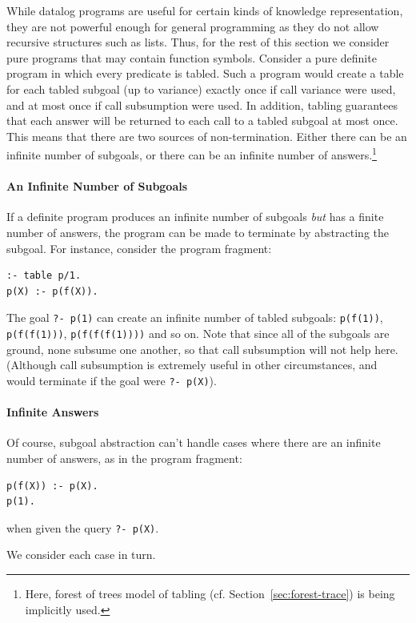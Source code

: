 While datalog programs are useful for certain kinds of knowledge
representation, they are not powerful enough for general programming
as they do not allow recursive structures such as lists.  Thus, for
the rest of this section we consider pure programs that may contain
function symbols.  Consider a pure definite program in which every
predicate is tabled.  Such a program would create a table for each
tabled subgoal (up to variance) exactly once if call variance were
used, and at most once if call subsumption were used.  In addition,
tabling guarantees that each answer will be returned to each call to a
tabled subgoal at most once.  This means that there are two sources of
non-termination.  Either there can be an infinite number of subgoals,
or there can be an infinite number of answers.\footnote{Here, forest
  of trees model of tabling (cf. Section~\ref{sec:forest-trace}) is
  being implicitly used.}

\paragraph{An Infinite Number of Subgoals}
%
If a definite program produces an infinite number of subgoals {\em
  but} has a finite number of answers, the program can be made to
terminate by abstracting the subgoal.  For instance, consider the
program fragment:
%
\begin{verbatim}
:- table p/1.
p(X) :- p(f(X)).
\end{verbatim}
%
The goal {\tt ?- p(1)} can create an infinite number of tabled
subgoals: {\tt p(f(1))}, {\tt p(f(f(1)))}, {\tt p(f(f(f(1))))} and so
on.  Note that since all of the subgoals are ground, none subsume one
another, so that call subsumption will not help here. (Although call
subsumption is extremely useful in other circumstances, and would terminate
if the goal were {\tt ?- p(X)}).

\paragraph*{Infinite Answers}
%
Of course, subgoal abstraction can't handle cases where there are an
infinite number of answers, as in the program fragment:
%
\begin{verbatim}
p(f(X)) :- p(X).
p(1).
\end{verbatim}
%
when given the query {\tt ?- p(X)}.  

We consider each case in turn.

